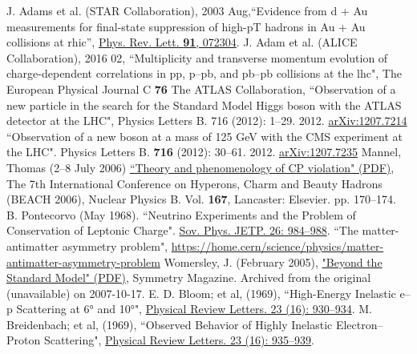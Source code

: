\begin{thebibliography}{50}
J. Adams et al. (STAR Collaboration), 2003 Aug,``Evidence from d + Au measurements for final-state suppression of high-pT hadrons in Au + Au collisions at rhic”, \href{http://dx.doi.org/10.1103/PhysRevLett.91.072304}{Phys. Rev. Lett. \textbf{91}, 072304}.
J. Adam et al. (ALICE Collaboration), 2016 02, ``Multiplicity and transverse momentum evolution of charge-dependent correlations in pp, p–pb, and pb–pb collisions at the lhc", The European Physical Journal C \textbf{76}
The ATLAS Collaboration, ``Observation of a new particle in the search for the Standard Model Higgs boson with the ATLAS detector at the LHC", Physics Letters B. 716 (2012): 1–29. 2012. \href{https://arxiv.org/abs/1207.7214}{arXiv:1207.7214}
``Observation of a new boson at a mass of 125 GeV with the CMS experiment at the LHC". Physics Letters B. \textbf{716} (2012): 30–61. 2012. \href{https://arxiv.org/abs/1207.7235}{arXiv:1207.7235}
Mannel, Thomas (2–8 July 2006) \href{https://indico.cern.ch/event/427023/session/6/contribution/43/attachments/912026/1288208/Lancester-Mannel-Proc.pdf}{``Theory and phenomenology of CP violation" (PDF)}, The 7th International Conference on Hyperons, Charm and Beauty Hadrons (BEACH 2006), Nuclear Physics B. Vol. \textbf{167}, Lancaster: Elsevier. pp. 170–174.
B. Pontecorvo (May 1968). ``Neutrino Experiments and the Problem of Conservation of Leptonic Charge". \href{http://www.jetp.ac.ru/cgi-bin/e/index/e/26/5/p984?a=list}{Sov. Phys. JETP. 26: 984–988}.
``The matter-antimatter asymmetry problem", \href{https://home.cern/science/physics/matter-antimatter-asymmetry-problem}{https://home.cern/science/physics/matter-antimatter-asymmetry-problem}
Womersley, J. (February 2005), \href{https://web.archive.org/web/20071017160238/http://www.symmetrymagazine.org/pdfs/200502/beyond_the_standard_model.pdf}{"Beyond the Standard Model" (PDF)}, Symmetry Magazine. Archived from the original (unavailable) on 2007-10-17.
 E. D. Bloom; et al, (1969), ``High-Energy Inelastic e–p Scattering at 6° and 10°", \href{https://doi.org/10.1103%2FPhysRevLett.23.930}{Physical Review Letters. 23 (16): 930–934}.
 M. Breidenbach; et al, (1969), ``Observed Behavior of Highly Inelastic Electron–Proton Scattering", \href{https://doi.org/10.1103%2FPhysRevLett.23.935}{Physical Review Letters. 23 (16): 935–939}.

\end{thebibliography}

